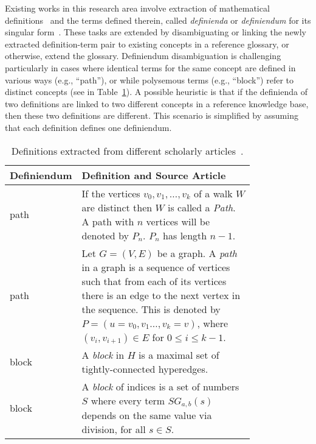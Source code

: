 Existing works in this research area involve extraction of mathematical definitions~\cite{berlioz2023hierarchical,asperti_extraction_2004,sun2023discoveringregex,vanetik2020automatedlstmcnn} and the terms defined therein, called \textit{definienda} or \textit{definiendum} for its singular form~\cite{berliozargot2021,jiang2023extracting}. These tasks are extended by disambiguating or linking the newly extracted definition-term pair to existing concepts in a reference glossary, or otherwise, extend the glossary.
Definiendum disambiguation is challenging particularly in cases where identical terms for the same concept are defined in various ways (e.g., ``path''), or while polysemous terms (e.g., ``block'') refer to distinct concepts (see in Table~\ref{tab:paper_def_example}). %
A possible heuristic is that if the definienda of two definitions are linked to two different concepts in a reference knowledge base, then these two definitions are different. This scenario is simplified by assuming that each definition defines one definiendum. 
\squeezeup
\begin{table}
    \centering
    \caption{Definitions extracted from different scholarly articles~\cite{jiang2023extracting}. %
    }
    \begin{tabular}{|l|p{0.8\linewidth}|}
          \hline
          Definiendum&Definition and Source Article\\\hline
          path&If the vertices $v_0,v_1,\ldots,v_k$ of a walk $W$ are distinct then $W$ is called a \emph{Path}. A path with $n$ vertices will be denoted by $P_n$. $P_n$ has length $n-1$.~\cite{kalayathankal2015operationspath1}\\\hline
          path&Let $G=(V,E)$ be a graph. A \emph{path} in a graph is a sequence of vertices such that from each of its vertices there is an edge to the next vertex in the sequence. This is denoted by $P=(u=v_0,v_1\ldots,v_k=v)$, where $(v_i,v_{i+1}) \in E$ for $0 \le i \le k-1$.~\cite{perera2012bipartitionpath2} \\\hline
          block&A \emph{block} in  $H$ is a maximal set of tightly-connected hyperedges.~\cite{ergemlidze20193block2}\\\hline
          block&A \emph{block} of indices is a set of numbers $S$ where every term $SG_{a,b}(s)$ depends on the same value via division, for all $s\in S$.~\cite{kupin2011subtractionblock1}\\\hline
    \end{tabular}
    \label{tab:paper_def_example}
\end{table}

